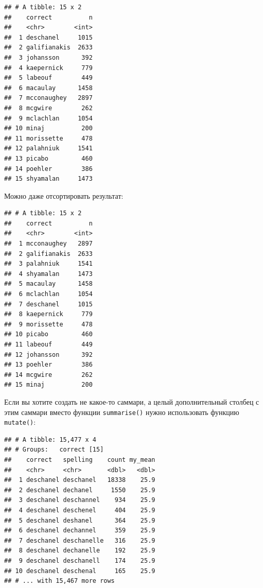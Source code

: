 \documentclass[]{book}
\newenvironment{Shaded}{\begin{snugshade}}{\end{snugshade}}
\newcommand{\DataTypeTok}[1]{\textcolor[rgb]{0.13,0.29,0.53}{#1}}
\newcommand{\KeywordTok}[1]{\textcolor[rgb]{0.13,0.29,0.53}{\textbf{#1}}}
\newcommand{\NormalTok}[1]{#1}
\newcommand{\OperatorTok}[1]{\textcolor[rgb]{0.81,0.36,0.00}{\textbf{#1}}}
\newcommand{\OtherTok}[1]{\textcolor[rgb]{0.56,0.35,0.01}{#1}}
\newcommand{\StringTok}[1]{\textcolor[rgb]{0.31,0.60,0.02}{#1}}
\begin{document}
\begin{verbatim}
## # A tibble: 15 x 2
##    correct          n
##    <chr>        <int>
##  1 deschanel     1015
##  2 galifianakis  2633
##  3 johansson      392
##  4 kaepernick     779
##  5 labeouf        449
##  6 macaulay      1458
##  7 mcconaughey   2897
##  8 mcgwire        262
##  9 mclachlan     1054
## 10 minaj          200
## 11 morissette     478
## 12 palahniuk     1541
## 13 picabo         460
## 14 poehler        386
## 15 shyamalan     1473
\end{verbatim}

Можно даже отсортировать результат:

\begin{Shaded}
\end{Shaded}

\begin{verbatim}
## # A tibble: 15 x 2
##    correct          n
##    <chr>        <int>
##  1 mcconaughey   2897
##  2 galifianakis  2633
##  3 palahniuk     1541
##  4 shyamalan     1473
##  5 macaulay      1458
##  6 mclachlan     1054
##  7 deschanel     1015
##  8 kaepernick     779
##  9 morissette     478
## 10 picabo         460
## 11 labeouf        449
## 12 johansson      392
## 13 poehler        386
## 14 mcgwire        262
## 15 minaj          200
\end{verbatim}

Если вы хотите создать не какое-то саммари, а целый дополнительный столбец с этим саммари вместо функции \texttt{summarise()} нужно использовать функцию \texttt{mutate()}:

\begin{Shaded}
\end{Shaded}

\begin{verbatim}
## # A tibble: 15,477 x 4
## # Groups:   correct [15]
##    correct   spelling    count my_mean
##    <chr>     <chr>       <dbl>   <dbl>
##  1 deschanel deschanel   18338    25.9
##  2 deschanel dechanel     1550    25.9
##  3 deschanel deschannel    934    25.9
##  4 deschanel deschenel     404    25.9
##  5 deschanel deshanel      364    25.9
##  6 deschanel dechannel     359    25.9
##  7 deschanel deschanelle   316    25.9
##  8 deschanel dechanelle    192    25.9
##  9 deschanel deschanell    174    25.9
## 10 deschanel deschenal     165    25.9
## # ... with 15,467 more rows
\end{verbatim}
\end{document}
